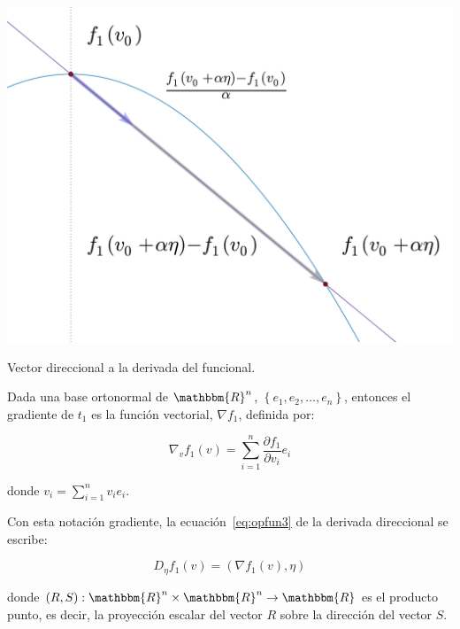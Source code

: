                 \begin{marginfigure}
                    \centering
                    \includegraphics[width=\textwidth]{./imagenes/trayectoriaderivada.pdf}
                    \caption{\label{fig:trayderivada}Vector direccional a la derivada del funcional.}
                \end{marginfigure}

                \begin{definicion}
                    Dada una base ortonormal de $\mathbbm{R}^n$, $\left\{ e_1, e_2, \dots, e_n \right\}$, entonces el gradiente de $t_1$ es la función vectorial, $\nabla f_1$, definida por:

                    \begin{equation} \label{eq:opfun3}
                        \nabla_v f_1(v) = \sum_{i=1}^n \frac{\partial f_1}{\partial v_i} e_i
                    \end{equation}

                    donde $v_i = \sum_{i=1}^n v_i e_i$.
                \end{definicion}

                Con esta notación gradiente, la ecuación~\ref{eq:opfun3} de la derivada direccional se escribe:

                \begin{equation}
                    D_{\eta} f_1(v) = \left( \nabla f_1(v), \eta \right)
                \end{equation}

                donde $\left( R, S \right): \mathbbm{R}^n \times \mathbbm{R}^n \to \mathbbm{R}$ es el producto punto, es decir, la proyección escalar del vector $R$ sobre la dirección del vector $S$.

